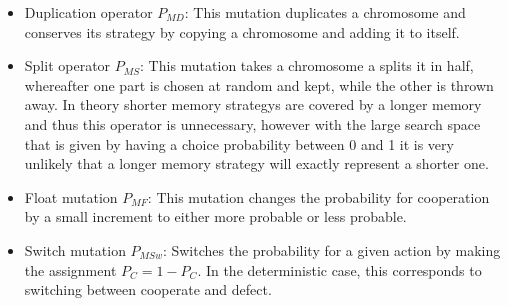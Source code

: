 \begin{itemize}
\item Duplication operator $P_{MD}$: This mutation duplicates a chromosome and conserves its strategy by copying a chromosome and adding it to itself.
\item Split operator $P_{MS}$: This mutation takes a chromosome a splits it in half, whereafter one part is chosen at random and kept, while the other is thrown away. In theory shorter memory strategys are covered by a longer memory and thus this operator is unnecessary, however with the large search space that is given by having a choice probability between 0 and 1 it is very unlikely that a longer memory strategy will exactly represent a shorter one.
\item Float mutation $P_{MF}$: This mutation changes the probability for cooperation by a small increment to either more probable or less probable.
\item Switch mutation $P_{MSw}$: Switches the probability for a given action by making the assignment $P_{C} = 1 - P_{C}$. In the deterministic case, this corresponds to switching between cooperate and defect.
\end{itemize}



